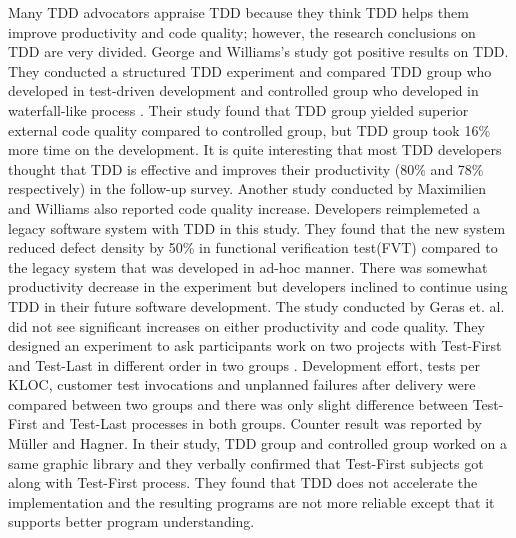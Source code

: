 Many TDD advocators appraise TDD because they think TDD helps them improve
productivity and code quality; however, the research conclusions on TDD are
very divided. George and Williams's study got positive results on TDD. They
conducted a structured TDD experiment and compared TDD group who developed
in test-driven development and controlled group who developed in
waterfall-like process \cite{George:03}. Their study found that TDD group
yielded superior external code quality compared to controlled group, but
TDD group took 16\% more time on the development. It is quite interesting
that most TDD developers thought that TDD is effective and improves their
productivity (80\% and 78\% respectively) in the follow-up survey.  Another
study conducted by Maximilien and Williams also reported code quality
increase. Developers reimplemeted a legacy software system with TDD in this
study. They found that the new system reduced defect density by 50\% in
functional verification test(FVT) compared to the legacy system that was
developed in ad-hoc manner\cite{Maximilien:03}. There was somewhat
productivity decrease in the experiment but developers inclined to continue
using TDD in their future software development. The study conducted by
Geras et. al. did not see significant increases on either productivity and
code quality.  They designed an experiment to ask participants work on two
projects with Test-First and Test-Last in different order in two groups
\cite{Geras:04}.  Development effort, tests per KLOC, customer test
invocations and unplanned failures after delivery were compared between two
groups and there was only slight difference between Test-First and
Test-Last processes in both groups. Counter result was reported by M\"uller
and Hagner\cite{Muller:02}.  In their study, TDD group and controlled group
worked on a same graphic library and they verbally confirmed that
Test-First subjects got along with Test-First process. They found that TDD
does not accelerate the implementation and the resulting programs are not
more reliable except that it supports better program understanding.

